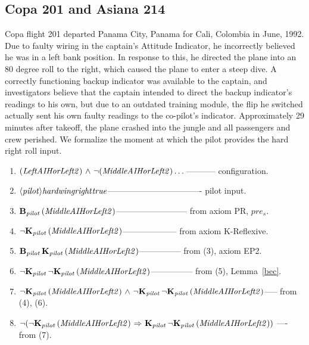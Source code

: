 

\subsection{Copa 201 and Asiana 214}
\noindent
Copa flight 201 departed Panama City, Panama for Cali, Colombia in June, 1992. Due to faulty wiring in the captain's Attitude Indicator, he incorrectly believed he was in a left bank position. In response to this, he directed the plane into an 80 degree roll to the right, which caused the plane to enter a steep dive. A correctly functioning backup indicator was available to the captain, and investigators believe that the captain intended to direct the backup indicator's readings to his own, but due to an outdated training module, the flip he switched actually sent his own faulty readings to the co-pilot's indicator. Approximately 29 minutes after takeoff, the plane crashed into the jungle and all passengers and crew perished. We formalize the moment at which the pilot provides the hard right roll input.
\begin{tcolorbox}	
	\begin{enumerate}
		\item $\mathit{(Left AI HorLeft2)} {\ \wedge \ } {\neg}\mathit{(Middle AI HorLeft2)} \dots$----------- configuration.
		\item $\mathbf{\langle\mathit{pilot}\rangle}{\mathit{hardwingright}}\mathit{true}$---------------------------------- pilot input.
		\item $\mathbf{B}_{\mathbf{\mathit{pilot}}}\,(\mathit{Middle AI HorLeft2})$-------------------------- from axiom PR, $\mathit{pre_s}$.
		\item ${\neg} \mathbf{K}_{\mathbf{\mathit{pilot}}}\,(\mathit{Middle AI HorLeft2})$-------------------- from axiom K-Reflexive.
		\item $\mathbf{B}_{\mathbf{\mathit{pilot}}}\,\mathbf{K}_{\mathbf{\mathit{pilot}}}\,(\mathit{Middle AI HorLeft2})$--------------- from (3), axiom EP2.
		\item ${\neg} \mathbf{K}_{\mathbf{\mathit{pilot}}}\, {\neg} \mathbf{K}_{\mathbf{\mathit{pilot}}}\,(\mathit{Middle AI HorLeft2})$--------------- from (5), Lemma~\ref{bec}.
		\item ${\neg} \mathbf{K}_{\mathbf{\mathit{pilot}}}\,(\mathit{Middle AI HorLeft2}) {\ \wedge \ } {\neg} \mathbf{K}_{\mathbf{\mathit{pilot}}}\, {\neg} \mathbf{K}_{\mathbf{\mathit{pilot}}}\,(\mathit{Middle AI HorLeft2})$----- from (4), (6).
		\item ${\neg}({\neg} \mathbf{K}_{\mathbf{\mathit{pilot}}}\,(\mathit{Middle AI HorLeft2}) {\ \Rightarrow \ } \mathbf{K}_{\mathbf{\mathit{pilot}}}\, {\neg} \mathbf{K}_{\mathbf{\mathit{pilot}}}\,(\mathit{Middle AI HorLeft2}))$ ---- from (7).
	\end{enumerate}
\end{tcolorbox}	
